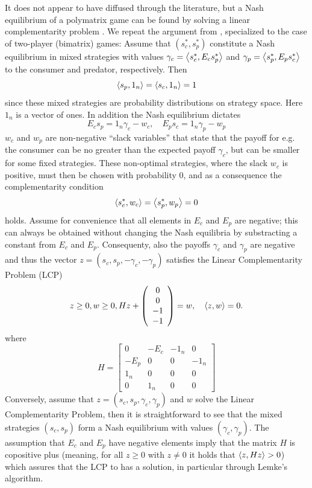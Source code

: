 It does not appear to have diffused through the literature, but a Nash equilibrium of a polymatrix game can be found by solving a linear complementarity problem \citep{miller1991copositive}. We repeat the argument from \citep{miller1991copositive}, specialized to the case of two-player (bimatrix) games: Assume that $(s^*_c,s^*_p)$ constitute a Nash equilibrium in mixed strategies with values $\gamma_c = \left \langle s^*_c,E_c s^*_p \right \rangle$ and   $\gamma_p = \left \langle s^*_p,E_p s^*_c \right \rangle$ to the consumer and predator, respectively. Then
\[
  \left \langle s_p,1_n \right \rangle =
  \left \langle s_c,1_n \right \rangle =
  1
\]
since these mixed strategies are probability distributions on strategy space. Here $1_n$ is a vector of ones. In addition the Nash equilibrium dictates
\[
  E_c s_p = 1_n \gamma_c - w_c
  ,\quad
  E_p s_c = 1_n \gamma_p  - w_p
\]
$w_c$ and $w_p$ are non-negative ``slack variables'' that state that the payoff for e.g. the consumer can be no greater than the expected payoff $\gamma_c$, but can be smaller for some fixed strategies. These non-optimal strategies, where the slack $w_c$ is positive, must then be chosen with probability 0, and as a consequence the complementarity condition
\[
  \left \langle s^*_c,w_c \right \rangle =   \left \langle s^*_p,w_p \right \rangle = 0
\]
holds. Assume for convenience that all elements in $E_c$ and $E_p$ are negative; this can always be obtained without changing the Nash equilibria by substracting a constant from $E_c$ and $E_p$. Consequenty, also the payoffs $\gamma_c$ and $\gamma_p$ are negative and thus the vector $z = (s_c,s_p,-\gamma_c,-\gamma_p)$ satisfies the Linear Complementarity Problem (LCP)
\[
  z \geq 0,
  w \geq 0 ,
  H
  z
  +
  \left(
    \begin{array}{c}
      0 \\
      0 \\
      -1 \\
      -1
    \end{array}
  \right)
  =
  w
  ,
  \quad
  \left \langle z,w \right \rangle = 0
  .
\]
where
\[
  H =
  \left[
    \begin{array}{cccc}
      0 & -E_c & -1_n & 0 \\ -E_p & 0 & 0 & -1_n \\
      1_n & 0 & 0 & 0 \\
      0 & 1_n & 0 & 0
    \end{array}
  \right]
\]
Conversely, assume that $z=(s_c,s_p,\gamma_c,\gamma_p)$ and $w$ solve the Linear Complementarity Problem, then it is straightforward to see that the mixed strategies $(s_c,s_p)$ form a Nash equilibrium with values $(\gamma_c,\gamma_p)$. The assumption that $E_c$ and $E_p$ have negative elements imply that the matrix $H$ is copositive plus (meaning, for all $z\geq0$ with $z\neq0$ it holds that $\left \langle z,Hz \right \rangle>0$) which assures that the LCP to has a solution, in particular through Lemke's algorithm.


